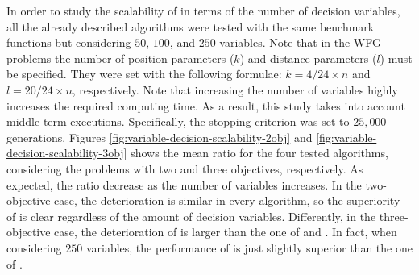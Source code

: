 In order to study the scalability of \VSDMOEA{} in terms of the number of decision variables, all the already described algorithms were tested with
the same benchmark functions but considering $50$, $100$, and $250$ variables.
%
Note that in the WFG problems the number of position parameters ($k$) and distance parameters ($l$) must be specified.
%
They were set with the following formulae: $k=4/24  \times n$ and $l= 20/24  \times n$, respectively.
%
Note that increasing the number of variables highly increases the required computing time.
%
As a result, this study takes into account middle-term executions.
%
Specifically, the stopping criterion was set to $25,000$ generations.
%
Figures \ref{fig:variable-decision-scalability-2obj} and \ref{fig:variable-decision-scalability-3obj} shows the mean \HV{} ratio for the four tested algorithms,
considering the problems with two and three objectives, respectively.
%
As expected, the \HV{} ratio decrease as the number of variables increases.
%
In the two-objective case, the deterioration is similar in every algorithm, so the superiority of \VSDMOEA{} is clear regardless of the amount of decision
variables.
%
Differently, in the three-objective case, the deterioration of \VSDMOEA{} is larger than the one of \RMOEA{} and \MOEAD{}.
%
In fact, when considering $250$ variables, the performance of \VSDMOEA{} is just slightly superior than the one of \RMOEA{}.


%
%
%


